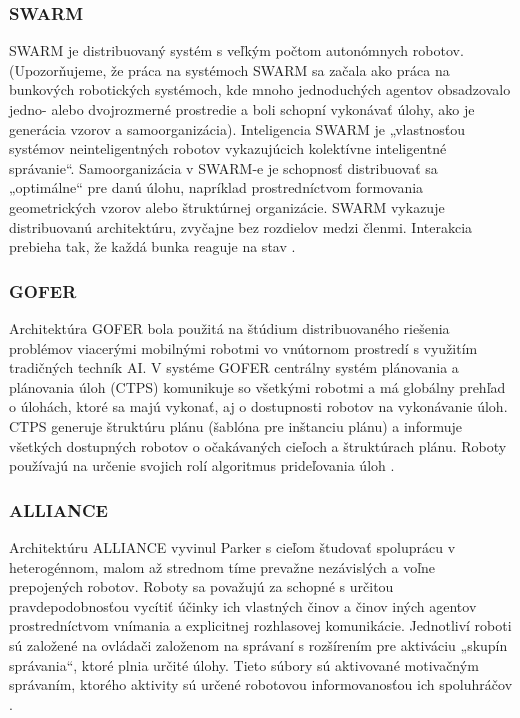 \subsubsection{SWARM}
SWARM je distribuovaný systém s veľkým počtom autonómnych robotov. (Upozorňujeme, že práca na systémoch SWARM sa
začala ako práca na bunkových robotických systémoch, kde mnoho jednoduchých agentov obsadzovalo jedno- alebo
dvojrozmerné prostredie a boli schopní vykonávať úlohy, ako je generácia vzorov a samoorganizácia). Inteligencia SWARM
je „vlastnosťou systémov neinteligentných robotov vykazujúcich kolektívne inteligentné správanie“. Samoorganizácia
v SWARM-e je schopnosť distribuovať sa „optimálne“ pre danú úlohu, napríklad prostredníctvom formovania geometrických
vzorov alebo štruktúrnej organizácie. SWARM vykazuje distribuovanú architektúru, zvyčajne bez rozdielov medzi členmi.
Interakcia prebieha tak, že každá bunka reaguje na stav \citep{beatriz}.

\subsubsection{GOFER}
Architektúra GOFER bola použitá na štúdium distribuovaného riešenia problémov viacerými mobilnými robotmi vo
vnútornom prostredí s využitím tradičných techník AI. V systéme GOFER centrálny systém plánovania a plánovania úloh
(CTPS) komunikuje so všetkými robotmi a má globálny prehľad o úlohách, ktoré sa majú vykonať, aj o dostupnosti robotov
na vykonávanie úloh. CTPS generuje štruktúru plánu (šablóna pre inštanciu plánu) a informuje všetkých dostupných robotov
o očakávaných cieľoch a štruktúrach plánu. Roboty používajú na určenie svojich rolí algoritmus prideľovania úloh \citep{caloud}.

\subsubsection{ALLIANCE}
Architektúru ALLIANCE vyvinul Parker \citep{parek} s cieľom študovať spoluprácu v heterogénnom, malom až strednom tíme
prevažne nezávislých a voľne prepojených robotov. Roboty sa považujú za schopné s určitou pravdepodobnosťou vycítiť
účinky ich vlastných činov a činov iných agentov prostredníctvom vnímania a explicitnej rozhlasovej komunikácie.
Jednotliví roboti sú založené na ovládači založenom na správaní s rozšírením pre aktiváciu „skupín správania“, ktoré
plnia určité úlohy. Tieto súbory sú aktivované motivačným správaním, ktorého aktivity sú určené robotovou
informovanosťou ich spoluhráčov \citep{beatriz} \citep{vascak}.

